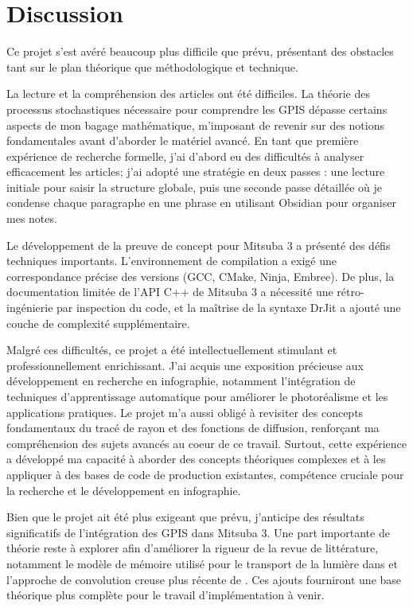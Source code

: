 \section{Discussion}

Ce projet s'est avéré beaucoup plus difficile que prévu, présentant des obstacles tant sur le plan théorique que méthodologique et technique.

La lecture et la compréhension des articles ont été difficiles. La théorie des processus stochastiques nécessaire pour comprendre les GPIS dépasse certains aspects de mon bagage mathématique, m'imposant de revenir sur des notions fondamentales avant d'aborder le matériel avancé. En tant que première expérience de recherche formelle, j'ai d'abord eu des difficultés à analyser efficacement les articles; j'ai adopté une stratégie en deux passes : une lecture initiale pour saisir la structure globale, puis une seconde passe détaillée où je condense chaque paragraphe en une phrase en utilisant Obsidian pour organiser mes notes.

Le développement de la preuve de concept pour Mitsuba 3 a présenté des défis techniques importants. L'environnement de compilation a exigé une correspondance précise des versions (GCC, CMake, Ninja, Embree). De plus, la documentation limitée de l'API C++ de Mitsuba 3 a nécessité une rétro-ingénierie par inspection du code, et la maîtrise de la syntaxe DrJit a ajouté une couche de complexité supplémentaire.

Malgré ces difficultés, ce projet a été intellectuellement stimulant et professionnellement enrichissant. J'ai acquis une exposition précieuse aux développement en recherche en infographie, notamment l'intégration de techniques d'apprentissage automatique pour améliorer le photoréalisme et les applications pratiques. Le projet m'a aussi obligé à revisiter des concepts fondamentaux du tracé de rayon et des fonctions de diffusion, renforçant ma compréhension des sujets avancés au coeur de ce travail. Surtout, cette expérience a développé ma capacité à aborder des concepts théoriques complexes et à les appliquer à des bases de code de production existantes, compétence cruciale pour la recherche et le développement en infographie.

Bien que le projet ait été plus exigeant que prévu, j'anticipe des résultats significatifs de l'intégration des GPIS dans Mitsuba 3. Une part importante de théorie reste à explorer afin d'améliorer la rigueur de la revue de littérature, notamment le modèle de mémoire utilisé pour le transport de la lumière dans \cite{seyb24from} et l'approche de convolution creuse plus récente de \textcite{xu25practical}. Ces ajouts fourniront une base théorique plus complète pour le travail d'implémentation à venir.
